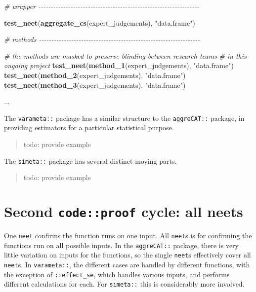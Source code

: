 \documentclass[
]{article}
\newenvironment{Shaded}{\begin{snugshade}}{\end{snugshade}}
\newcommand{\CommentTok}[1]{\textcolor[rgb]{0.56,0.35,0.01}{\textit{#1}}}
\newcommand{\KeywordTok}[1]{\textcolor[rgb]{0.13,0.29,0.53}{\textbf{#1}}}
\newcommand{\NormalTok}[1]{#1}
\newcommand{\StringTok}[1]{\textcolor[rgb]{0.31,0.60,0.02}{#1}}
\begin{document}
\begin{Shaded}
\begin{Highlighting}[]
\CommentTok{\# wrapper {-}{-}{-}{-}{-}{-}{-}{-}{-}{-}{-}{-}{-}{-}{-}{-}{-}{-}{-}{-}{-}{-}{-}{-}{-}{-}{-}{-}{-}{-}{-}{-}{-}{-}{-}{-}{-}{-}{-}{-}{-}{-}{-}{-}{-}{-}{-}{-}{-}{-}{-}{-}{-}{-}{-}{-}{-}{-}{-}{-}{-}{-}{-}{-}{-}}

\KeywordTok{test\_neet}\NormalTok{(}\KeywordTok{aggregate\_cs}\NormalTok{(expert\_judgements), }\StringTok{"data.frame"}\NormalTok{)}

\CommentTok{\# methods {-}{-}{-}{-}{-}{-}{-}{-}{-}{-}{-}{-}{-}{-}{-}{-}{-}{-}{-}{-}{-}{-}{-}{-}{-}{-}{-}{-}{-}{-}{-}{-}{-}{-}{-}{-}{-}{-}{-}{-}{-}{-}{-}{-}{-}{-}{-}{-}{-}{-}{-}{-}{-}{-}{-}{-}{-}{-}{-}{-}{-}{-}{-}{-}{-}}

\CommentTok{\# the methods are masked to preserve blinding between research teams }
\CommentTok{\# in this ongoing project}
\KeywordTok{test\_neet}\NormalTok{(}\KeywordTok{method\_1}\NormalTok{(expert\_judgements), }\StringTok{"data.frame"}\NormalTok{)}
\KeywordTok{test\_neet}\NormalTok{(}\KeywordTok{method\_2}\NormalTok{(expert\_judgements), }\StringTok{"data.frame"}\NormalTok{)}
\KeywordTok{test\_neet}\NormalTok{(}\KeywordTok{method\_3}\NormalTok{(expert\_judgements), }\StringTok{"data.frame"}\NormalTok{)}

\NormalTok{...}
\end{Highlighting}
\end{Shaded}

The \texttt{varameta::} package has a similar structure to the \texttt{aggreCAT::} package, in providing estimators for a particular statistical purpose.

\begin{quote}
todo: provide example
\end{quote}

The \texttt{simeta::} package has several distinct moving parts.

\begin{quote}
todo: provide example
\end{quote}

\hypertarget{second-codeproof-cycle-all-neets}{%
\section{\texorpdfstring{Second \texttt{code::proof} cycle: all neets}{Second code::proof cycle: all neets}}\label{second-codeproof-cycle-all-neets}}

One \texttt{neet} confirms the function runs on one input. All \texttt{neet}s is for confirming the functions run on all possible inputs. In the \texttt{aggreCAT::} package, there is very little variation on inputs for the functions, so the single \texttt{neet}s effectively cover all \texttt{neet}s. In \texttt{varameta::}, the different cases are handled by different functions, with the exception of \texttt{::effect\_se}, which handles various inputs, and performs different calculations for each. For \texttt{simeta::} this is considerably more involved.
\end{document}
